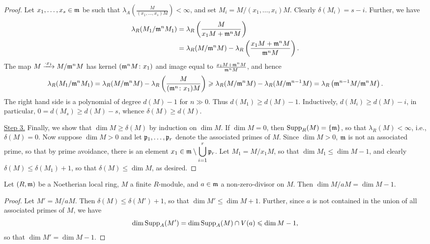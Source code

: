 \begin{proof}
    Let $x_1,\dots,x_s\in\mathfrak{m}$ be such that $\lambda_A\left(\frac{M}{(x_1, \dots, x_s)M}\right) < \infty$, and set $M_i = M/(x_1,\dots,x_i)M$. Clearly $\delta(M_i) = s - i$. Further, we have 
    \begin{align*}
        \lambda_R(M_1/\mathfrak{m}^n M_1) &= \lambda_R\left(\frac{M}{x_1 M + \mathfrak{m}^n M}\right)\\
        &= \lambda_R(M/\mathfrak{m}^n M) - \lambda_R\left(\frac{x_1 M + \mathfrak{m}^n M}{\mathfrak{m}^n M}\right).
    \end{align*}
    The map $M\xrightarrow{\cdot x_1} M/\mathfrak{m}^n M$ has kernel $(\mathfrak{m}^n M\colon x_1)$ and image equal to $\frac{x_1 M + \mathfrak{m}^n M}{\mathfrak{m}^n M}$, and hence 
    \begin{equation*}
        \lambda_R(M_1/\mathfrak{m}^n M_1) = \lambda_R(M/\mathfrak{m}^n M) - \lambda_R\left(\frac{M}{(\mathfrak{m}^n\colon x_1) M}\right)\geqslant\lambda_R(M/\mathfrak{m}^n M) - \lambda_R(M/\mathfrak{m}^{n - 1}M) = \lambda_R\left(\mathfrak{m}^{n - 1}M /\mathfrak{m}^n M\right).
    \end{equation*}
    The right hand side is a polynomial of degree $d(M) - 1$ for $n\gg 0$. Thus $d(M_1)\ge d(M) - 1$. Inductively, $d(M_i)\ge d(M) - i$, in particular, $0 = d(M_s)\ge d(M) - s$, whence $\delta(M)\ge d(M)$.

    \hfill

    \noindent\underline{Step 3.} Finally, we show that $\dim M\ge \delta(M)$ by induction on $\dim M$. If $\dim M = 0$, then $\operatorname{Supp}_R(M) = \{\mathfrak{m}\}$, so that $\lambda_R(M) < \infty$, i.e., $\delta(M) = 0$. Now suppose $\dim M > 0$ and let $\mathfrak{p}_1,\dots,\mathfrak{p}_r$ denote the associated primes of $M$. Since $\dim M > 0$, $\mathfrak{m}$ is not an associated prime, so that by prime avoidance, there is an element $\displaystyle x_1\in\mathfrak{m}\setminus\bigcup_{i = 1}^r\mathfrak{p}_r$. Let $M_1 = M/x_1 M$, so that $\dim M_1\le\dim M - 1$, and clearly $\delta(M)\le\delta(M_1) + 1$, so that $\delta(M)\le\dim M$, as desired.
\end{proof}

\begin{corollary}
    Let $(R,\mathfrak{m})$ be a Noetherian local ring, $M$ a finite $R$-module, and $a\in\mathfrak{m}$ a non-zero-divisor on $M$. Then $\dim M/aM = \dim M - 1$.
\end{corollary}
\begin{proof}
    Let $M' = M/aM$. Then $\delta(M)\le\delta(M') + 1$, so that $\dim M'\le\dim M + 1$. Further, since $a$ is not contained in the union of all associated primes of $M$, we have 
    \begin{equation*}
        \dim\operatorname{Supp}_A(M') = \dim\operatorname{Supp}_A(M)\cap V(a)\leqslant\dim M - 1,
    \end{equation*}
    so that $\dim M' = \dim M - 1$.
\end{proof}

